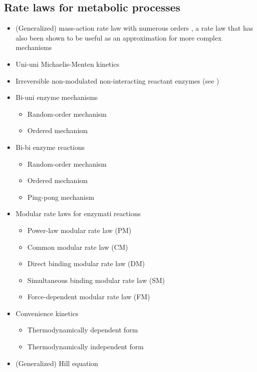 \subsection{Rate laws for metabolic processes}
\begin{itemize}
  \item (Generalized) mass-action rate law with numerous orders \citep[p.~16]{Guldberg1879, Heinrich1996},
        a rate law that has also been shown to be useful as an approximation for more complex mechanisms
        \citep{Draeger2007a, Draeger2009a}
  \item Uni-uni Michaelis-Menten kinetics \citep{Michaelis1913}
  \item Irreversible non-modulated non-interacting reactant enzymes (see \SBO)
  \item Bi-uni enzyme mechanisms \citep{Segel1993, Bisswanger2000, Cornish-Bowden2004}
  \begin{itemize}
    \item Random-order mechanism
    \item Ordered mechanism
  \end{itemize}
  \item Bi-bi enzyme reactions \citep{Segel1993, Bisswanger2000, Cornish-Bowden2004}
  \begin{itemize}
    \item Random-order mechanism \citep[p.~169]{Cornish-Bowden2004}
    \item Ordered mechanism
    \item Ping-pong mechanism
  \end{itemize}
  \item Modular rate laws for enzymati reactions \citep{Liebermeister2010}
  \begin{itemize}
    \item Power-law modular rate law (PM)
    \item Common modular rate law (CM)
    \item Direct binding modular rate law (DM)
    \item Simultaneous binding modular rate law (SM)
    \item Force-dependent modular rate law (FM)
  \end{itemize}
  \item Convenience kinetics \citep{Liebermeister2006}
  \begin{itemize}
    \item Thermodynamically dependent form
    \item Thermodynamically independent form
  \end{itemize}
  \item (Generalized) Hill equation \citep[p.~314]{Hill1910, Cornish-Bowden2004}
\end{itemize}


